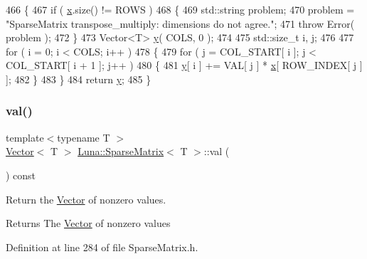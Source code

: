 \begin{DoxyCode}
466   \{
467     \textcolor{keywordflow}{if} ( \hyperlink{namespaceHeat__plot_aa88370c16b85b784ccbde3ed88bc1991}{x}.size() != ROWS )
468     \{
469       std::string problem;
470       problem  = \textcolor{stringliteral}{"SparseMatrix transpose\_multiply: dimensions do not agree."};
471       \textcolor{keywordflow}{throw} Error( problem );
472     \}
473     Vector<T> \hyperlink{ODE__BVP__test_8cpp_adf764cbdea00d65edcd07bb9953ad2b7ae1f9fdb8b786c63efc4ce44eeacd17f2}{y}( COLS, 0 );
474 
475     std::size\_t i, j;
476 
477     \textcolor{keywordflow}{for} ( i = 0; i < COLS; i++ )
478     \{
479       \textcolor{keywordflow}{for} ( j = COL\_START[ i ]; j < COL\_START[ i + 1 ]; j++ )
480       \{
481         \hyperlink{ODE__BVP__test_8cpp_adf764cbdea00d65edcd07bb9953ad2b7ae1f9fdb8b786c63efc4ce44eeacd17f2}{y}[ i ] += VAL[ j ] * \hyperlink{namespaceHeat__plot_aa88370c16b85b784ccbde3ed88bc1991}{x}[ ROW\_INDEX[ j ] ];
482       \}
483     \}
484     \textcolor{keywordflow}{return} \hyperlink{ODE__BVP__test_8cpp_adf764cbdea00d65edcd07bb9953ad2b7ae1f9fdb8b786c63efc4ce44eeacd17f2}{y};
485   \}
\end{DoxyCode}
\mbox{\label{classLuna_1_1SparseMatrix_ac22d87e2fb618c6140c579bc72dd503b}} 
\subsubsection{\texorpdfstring{val()}{val()}}
{\footnotesize\ttfamily template$<$typename T $>$ \\
\hyperlink{classLuna_1_1Vector}{Vector}$<$ T $>$ \hyperlink{classLuna_1_1SparseMatrix}{Luna\+::\+Sparse\+Matrix}$<$ T $>$\+::val (\begin{DoxyParamCaption}{ }\end{DoxyParamCaption}) const\hspace{0.3cm}{\ttfamily [inline]}}



Return the \hyperlink{classLuna_1_1Vector}{Vector} of nonzero values. 

\begin{DoxyReturn}{Returns}
The \hyperlink{classLuna_1_1Vector}{Vector} of nonzero values 
\end{DoxyReturn}


Definition at line 284 of file Sparse\+Matrix.\+h.




